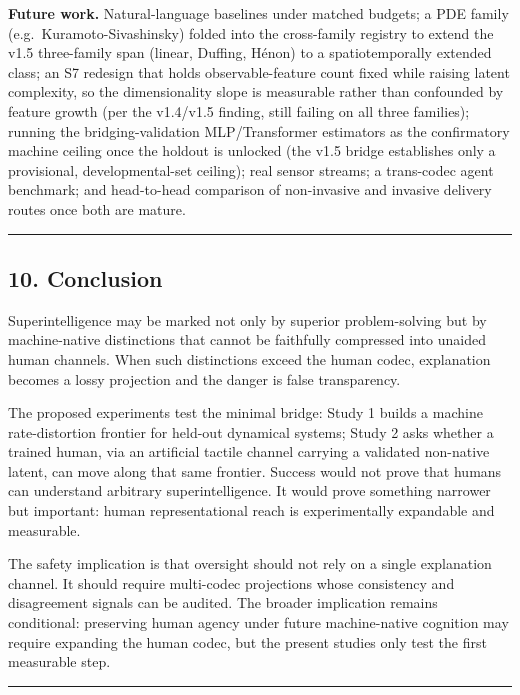 \documentclass[
  11pt,
]{article}
\begin{document}
\textbf{Future work.} Natural-language baselines
under matched budgets; a PDE family
(e.g.~Kuramoto-Sivashinsky) folded into the
cross-family registry to extend the v1.5
three-family span (linear, Duffing, Hénon) to a
spatiotemporally extended class; an S7 redesign
that holds observable-feature count fixed while
raising latent complexity, so the dimensionality
slope is measurable rather than confounded by
feature growth (per the v1.4/v1.5 finding, still
failing on all three families); running the
bridging-validation MLP/Transformer estimators
as the confirmatory machine ceiling once the
holdout is unlocked (the v1.5 bridge establishes
only a provisional, developmental-set ceiling);
real sensor streams; a trans-codec agent
benchmark; and head-to-head comparison of
non-invasive and invasive delivery routes once
both are mature.

\begin{center}\rule{0.5\linewidth}{0.5pt}\end{center}

\subsection{10. Conclusion}\label{conclusion}

Superintelligence may be marked not only by
superior problem-solving but by machine-native
distinctions that cannot be faithfully
compressed into unaided human channels. When
such distinctions exceed the human codec,
explanation becomes a lossy projection and the
danger is false transparency.

The proposed experiments test the minimal
bridge: Study 1 builds a machine rate-distortion
frontier for held-out dynamical systems; Study 2
asks whether a trained human, via an artificial
tactile channel carrying a validated non-native
latent, can move along that same frontier.
Success would not prove that humans can
understand arbitrary superintelligence. It would
prove something narrower but important: human
representational reach is experimentally
expandable and measurable.

The safety implication is that oversight should
not rely on a single explanation channel. It
should require multi-codec projections whose
consistency and disagreement signals can be
audited. The broader implication remains
conditional: preserving human agency under
future machine-native cognition may require
expanding the human codec, but the present
studies only test the first measurable step.

\begin{center}\rule{0.5\linewidth}{0.5pt}\end{center}
\end{document}
